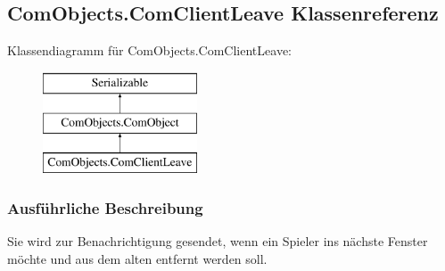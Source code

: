 \hypertarget{a00020}{\subsection{Com\-Objects.\-Com\-Client\-Leave Klassenreferenz}
\label{a00020}
}
Klassendiagramm für Com\-Objects.\-Com\-Client\-Leave\-:\begin{figure}[H]
\begin{center}
\leavevmode
\includegraphics[height=3.000000cm]{a00020}
\end{center}
\end{figure}


\subsubsection{Ausführliche Beschreibung}
Sie wird zur Benachrichtigung gesendet, wenn ein Spieler ins nächste Fenster möchte und aus dem alten entfernt werden soll. 